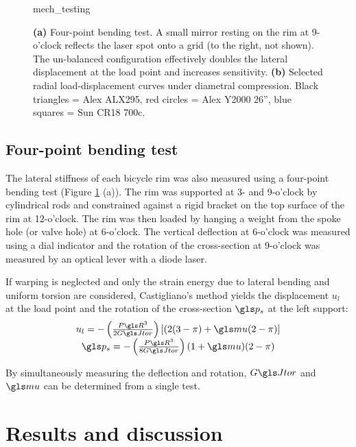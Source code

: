 \documentclass[../thesis.tex]{subfiles}
\begin{document}
\begin{figure}
  \centering
  {mech_testing}
  \caption{\textbf{(a)} Four-point bending test. A small mirror resting on the rim at 9-o’clock reflects the laser spot onto a grid (to the right, not shown). The un-balanced configuration effectively doubles the lateral displacement at the load point and increases sensitivity. \textbf{(b)} Selected radial load-displacement curves under diametral compression. Black triangles = Alex ALX295, red circles = Alex Y2000 26'', blue squares = Sun CR18 700c.}
  \label{fig:mech_tests}
\end{figure}

\subsection{Four-point bending test}

The lateral stiffness of each bicycle rim was also measured using a four-point bending test (Figure \ref{fig:mech_tests} (a)). The rim was supported at 3- and 9-o'clock by cylindrical rods and constrained against a rigid bracket on the top surface of the rim at 12-o'clock. The rim was then loaded by hanging a weight from the spoke hole (or valve hole) at 6-o'clock. The vertical deflection at 6-o'clock was measured using a dial indicator and the rotation of the cross-section at 9-o'clock was measured by an optical lever with a diode laser.

If warping is neglected and only the strain energy due to lateral bending and uniform torsion are considered, Castigliano's method yields the displacement $u_l$ at the load point and the rotation of the cross-section $\p_s$ at the left support:
  \begin{equation}\label{eq:u_4p}
  \begin{array}{c}
  u_l = -\left(\frac{P\R^3}{2\GJ}\right) [(2(3-\pi)+\m(2-\pi)]\\
  \p_s = -\left(\frac{P\R^3}{8\GJ}\right) (1+\m)(2-\pi)
  \end{array}
  \end{equation}

By simultaneously measuring the deflection and rotation, $\GJ$ and $\m$ can be determined from a single test.

\section{Results and discussion}
\end{document}
